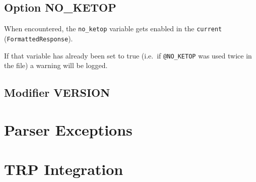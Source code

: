 \subsection{Option NO\_KETOP}

When encountered, the \verb|no_ketop| variable gets enabled in the \verb|current| \\(\verb|FormattedResponse|).

If that variable has already been set to true (i.e.\ if \verb|@NO_KETOP| was used twice in the file) a warning will be logged.

\subsection{Modifier VERSION}



\section{Parser Exceptions}

\section{TRP Integration}
